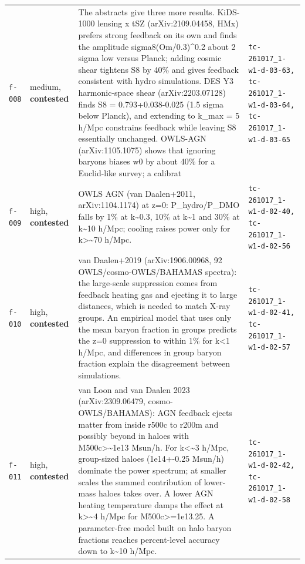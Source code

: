 \documentclass[11pt,a4paper]{article}
\begin{document}
\begin{longtable}{@{}p{}p{}p{}p{}@{}}
\texttt{f-008} & medium, \textbf{contested} & The abstracts give three more results. KiDS-1000 lensing x tSZ (arXiv:2109.04458, HMx) prefers strong feedback on its own and finds the amplitude sigma8(Om/0.3)\textasciicircum{}0.2 about 2 sigma low versus Planck; adding cosmic shear tightens S8 by 40\% and gives feedback consistent with hydro simulations. DES Y3 harmonic-space shear (arXiv:2203.07128) finds S8 = 0.793+0.038-0.025 (1.5 sigma below Planck), and extending to k\_max = 5 h/Mpc constrains feedback while leaving S8 essentially unchanged. OWLS-AGN (arXiv:1105.1075) shows that ignoring baryons biases w0 by about 40\% for a Euclid-like survey; a calibrat & \texttt{tc-261017\_\allowbreak{}1-w1-d-03-63,\allowbreak{} tc-261017\_\allowbreak{}1-w1-d-03-64,\allowbreak{} tc-261017\_\allowbreak{}1-w1-d-03-65} \\
\texttt{f-009} & high, \textbf{contested} & OWLS AGN (van Daalen+2011, arXiv:1104.1174) at z=0: P\_hydro/P\_DMO falls by 1\% at k\textasciitilde{}0.3, 10\% at k\textasciitilde{}1 and 30\% at k\textasciitilde{}10 h/Mpc; cooling raises power only for k\textgreater{}\textasciitilde{}70 h/Mpc. & \texttt{tc-261017\_\allowbreak{}1-w1-d-02-40,\allowbreak{} tc-261017\_\allowbreak{}1-w1-d-02-56} \\
\texttt{f-010} & high, \textbf{contested} & van Daalen+2019 (arXiv:1906.00968, 92 OWLS/cosmo-OWLS/BAHAMAS spectra): the large-scale suppression comes from feedback heating gas and ejecting it to large distances, which is needed to match X-ray groups. An empirical model that uses only the mean baryon fraction in groups predicts the z=0 suppression to within 1\% for k\textless{}1 h/Mpc, and differences in group baryon fraction explain the disagreement between simulations. & \texttt{tc-261017\_\allowbreak{}1-w1-d-02-41,\allowbreak{} tc-261017\_\allowbreak{}1-w1-d-02-57} \\
\texttt{f-011} & high, \textbf{contested} & van Loon and van Daalen 2023 (arXiv:2309.06479, cosmo-OWLS/BAHAMAS): AGN feedback ejects matter from inside r500c to r200m and possibly beyond in haloes with M500c\textgreater{}\textasciitilde{}1e13 Msun/h. For k\textless{}\textasciitilde{}3 h/Mpc, group-sized haloes (1e14+-0.25 Msun/h) dominate the power spectrum; at smaller scales the summed contribution of lower-mass haloes takes over. A lower AGN heating temperature damps the effect at k\textgreater{}\textasciitilde{}4 h/Mpc for M500c\textgreater{}=1e13.25. A parameter-free model built on halo baryon fractions reaches percent-level accuracy down to k\textasciitilde{}10 h/Mpc. & \texttt{tc-261017\_\allowbreak{}1-w1-d-02-42,\allowbreak{} tc-261017\_\allowbreak{}1-w1-d-02-58} \\

\end{longtable}
\end{document}
